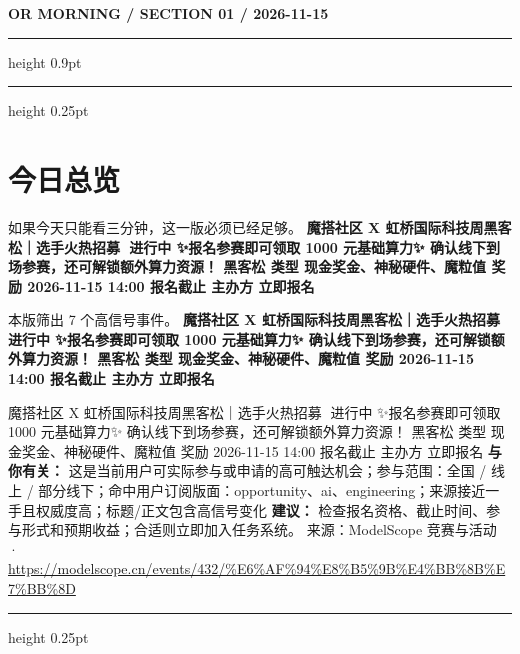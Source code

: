 \documentclass[10.5pt]{ctexart}
\begin{document}
{\small\bfseries OR MORNING / SECTION 01 / 2026-11-15}
\vspace{2mm}
\hrule height 0.9pt
\vspace{1.5mm}
\hrule height 0.25pt
\vspace{4mm}
\section*{今日总览}
{\color{ormuted} 如果今天只能看三分钟，这一版必须已经足够。}
\vspace{2mm}
{\fontsize{25}{29}\selectfont\bfseries 魔搭社区 X 虹桥国际科技周黑客松｜选手火热招募🚀 进行中 ✨报名参赛即可领取 1000 元基础算力✨ 确认线下到场参赛，还可解锁额外算力资源！ 黑客松 类型 现金奖金、神秘硬件、魔粒值 奖励 2026-11-15 14:00 报名截止 主办方 立即报名}\par
\vspace{2mm}
{\large 本版筛出 7 个高信号事件。}
\vspace{3mm}
{\Large\bfseries 魔搭社区 X 虹桥国际科技周黑客松｜选手火热招募🚀 进行中 ✨报名参赛即可领取 1000 元基础算力✨ 确认线下到场参赛，还可解锁额外算力资源！ 黑客松 类型 现金奖金、神秘硬件、魔粒值 奖励 2026-11-15 14:00 报名截止 主办方 立即报名}\par
魔搭社区 X 虹桥国际科技周黑客松｜选手火热招募🚀 进行中 ✨报名参赛即可领取 1000 元基础算力✨ 确认线下到场参赛，还可解锁额外算力资源！ 黑客松 类型 现金奖金、神秘硬件、魔粒值 奖励 2026-11-15 14:00 报名截止 主办方 立即报名
\textbf{与你有关：} 这是当前用户可实际参与或申请的高可触达机会；参与范围：全国 / 线上 / 部分线下；命中用户订阅版面：opportunity、ai、engineering；来源接近一手且权威度高；标题/正文包含高信号变化
\textbf{建议：} 检查报名资格、截止时间、参与形式和预期收益；合适则立即加入任务系统。
{\footnotesize\color{ormuted} 来源：ModelScope 竞赛与活动 · \url{https://modelscope.cn/events/432/%E6%AF%94%E8%B5%9B%E4%BB%8B%E7%BB%8D}}
\vspace{3mm}
\hrule height 0.25pt
\vspace{3mm}
\end{document}
